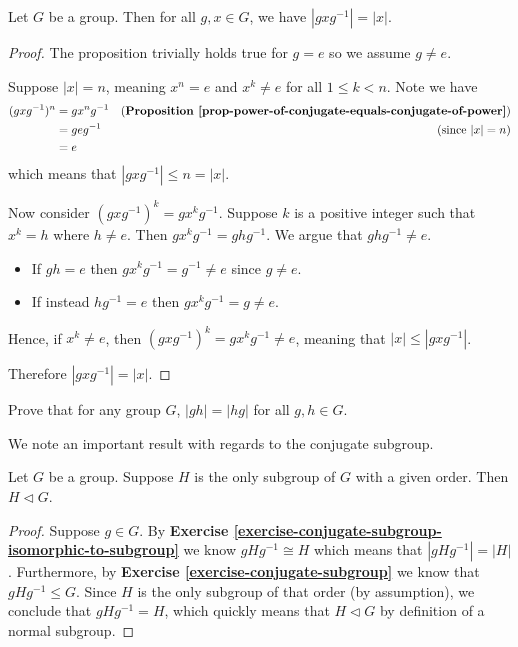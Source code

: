 \begin{proposition}\label{prop-order-of-conjugate-element equals-order-of-element}
    Let $G$ be a group. Then for all $g, x \in G$, we have $|gxg^{-1}| = |x|$.
\end{proposition}
\begin{proof}
    The proposition trivially holds true for $g = e$ so we assume $g \neq e$.

    Suppose $|x| = n$, meaning $x^n = e$ and $x^k \neq e$ for all $1 \leq k < n$. Note we have
    \begin{align*}
        (gxg^{-1})^n  &= gx^ng^{-1} & (\textbf{Proposition \ref{prop-power-of-conjugate-equals-conjugate-of-power}})\\
        &= geg^{-1} & (\text{since } |x| = n)\\
        &= e
    \end{align*}
    which means that $|gxg^{-1}| \leq n = |x|$.

    Now consider $(gxg^{-1})^k = gx^kg^{-1}$. Suppose $k$ is a positive integer such that $x^k = h$ where $h \neq e$. Then $gx^kg^{-1} = ghg^{-1}$. We argue that $ghg^{-1} \neq e$.
    \begin{itemize}
        \item If $gh = e$ then $gx^kg^{-1} = g^{-1} \neq e$ since $g \neq e$.
        \item If instead $hg^{-1} = e$ then $gx^kg^{-1} = g \neq e$.
    \end{itemize}
    Hence, if $x^k \neq e$, then $(gxg^{-1})^k = gx^kg^{-1} \neq e$, meaning that $|x| \leq |gxg^{-1}|$.

    Therefore $|gxg^{-1}| = |x|$.
\end{proof}

\begin{exercise}
    Prove that for any group $G$, $|gh| = |hg|$ for all $g, h \in G$.
\end{exercise}

We note an important result with regards to the conjugate subgroup.
\begin{theorem}\label{thrm-unique-subgroup-of-given-order-is-normal}
    Let $G$ be a group. Suppose $H$ is the only subgroup of $G$ with a given order. Then $H \lhd G$.
\end{theorem}
\begin{proof}
    Suppose $g \in G$. By \textbf{Exercise \ref{exercise-conjugate-subgroup-isomorphic-to-subgroup}} we know $gHg^{-1} \cong H$ which means that $|gHg^{-1}| = |H|$. Furthermore, by \textbf{Exercise \ref{exercise-conjugate-subgroup}} we know that $gHg^{-1} \leq G$. Since $H$ is the only subgroup of that order (by assumption), we conclude that $gHg^{-1} = H$, which quickly means that $H \lhd G$ by definition of a normal subgroup.
\end{proof}

